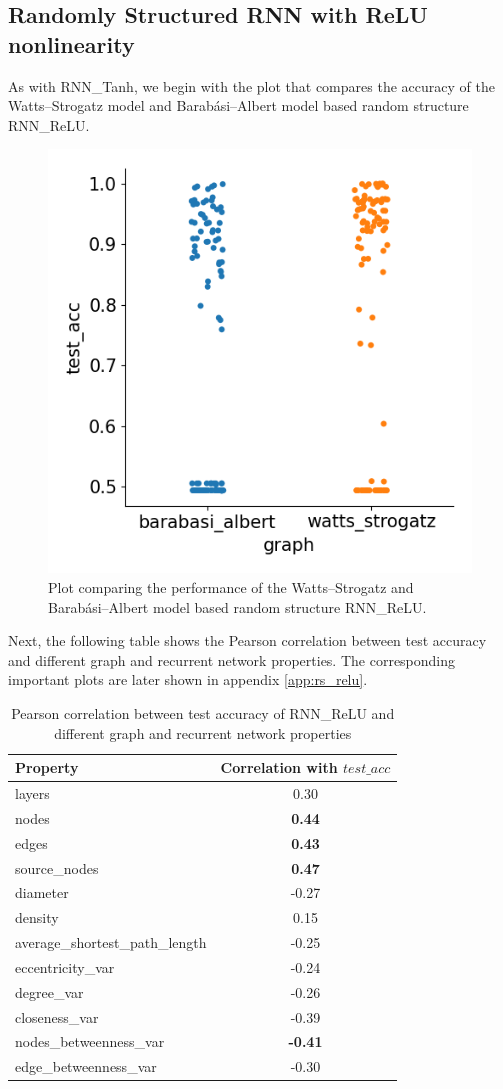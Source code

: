 \subsection{Randomly Structured RNN with ReLU nonlinearity}

As with RNN\_Tanh, we begin with the plot that compares the accuracy of the Watts–Strogatz model and Barabási–Albert model based random structure RNN\_ReLU.

\begin{figure}[H]
	\centering
	\includegraphics[width=0.45\linewidth]{images/results/random/relu/graph_test_acc.png}
	\caption[Performance of the WS and BA based random structure RNN\_ReLU]%
	{Plot comparing the performance of the Watts–Strogatz and Barabási–Albert model based random structure RNN\_ReLU.}
	\label{fig:relu_acc_comp}
\end{figure}

Next, the following table shows the Pearson correlation between test accuracy and different graph and recurrent network properties. The corresponding important plots are later shown in appendix \ref{app:rs_relu}.

\begin{table}[h]
	\centering
	\begin{tabular}{|l|c|}
	    \hline
		\textbf{Property} & \textbf{Correlation with $test\_acc$}\\
		\hline
		layers & 0.30\\
		nodes & \textbf{0.44}\\
		edges & \textbf{0.43}\\
		source\_nodes & \textbf{0.47}\\
		diameter & -0.27\\
		density & 0.15\\
		average\_shortest\_path\_length & -0.25\\
		eccentricity\_var & -0.24\\
		degree\_var & -0.26\\
		closeness\_var & -0.39\\
		nodes\_betweenness\_var & \textbf{-0.41}\\
		edge\_betweenness\_var & -0.30\\
		\hline
	\end{tabular}
	\caption[Pearson correlation between test accuracy of RNN\_ReLU and different graph and recurrent network properties]{Pearson correlation between test accuracy of RNN\_ReLU and different graph and recurrent network properties}
	\label{tab:relu_corr}
\end{table}

